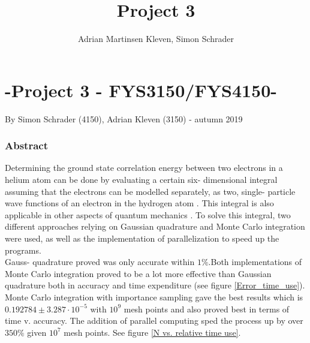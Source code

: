 \documentclass[10pt,a4paper]{article}
\author{Adrian Martinsen Kleven, Simon Schrader}
\title{Project 3}
\begin{document}
\part*{-Project 3 - FYS3150/FYS4150-
}
{\large By Simon Schrader (4150), Adrian Kleven (3150) - autumn 2019
}
\tableofcontents

\listoffigures
\listoftables
\clearpage
 
\section{Abstract}
Determining the ground state correlation energy between two electrons in a helium atom can be done by evaluating a certain six- dimensional integral assuming that the electrons can be modelled separately, as two, single- particle wave functions of an electron in the hydrogen atom \cite{Problem_set_3}. This integral is also applicable in other aspects of quantum mechanics \cite{Problem_set_3}. To solve this integral, two different approaches relying on Gaussian quadrature and Monte Carlo integration were used, as well as the implementation of parallelization to speed up the programs.\\Gauss- quadrature proved was only accurate within $1\%$.Both implementations of Monte Carlo integration proved to be a lot more effective than Gaussian quadrature both in accuracy and time expenditure (see figure \ref{Error_time_use}). Monte Carlo integration with importance sampling gave the best results which is $0.192784\pm 3.287\cdot10^{-5}$ with $10^9$ mesh points and also proved best in terms of time v. accuracy. The addition of parallel computing sped the process up by over $350\%$ given $10^7$ mesh points. See figure \ref{N vs. relative time use}.
\end{document}
